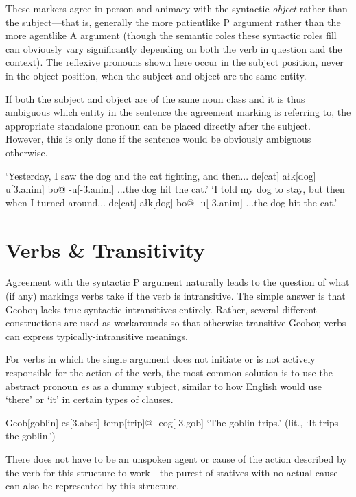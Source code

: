 \documentclass[a4paper,11pt,oneside,openany]{memoir}
\begin{document}
These markers agree in person and animacy with the syntactic \emph{object} rather than the subject---that is, generally the more patientlike P argument rather than the more agentlike A argument (though the semantic roles these syntactic roles fill can obviously vary significantly depending on both the verb in question and the context). The reflexive pronouns shown here occur in the subject position, never in the object position, when the subject and object are the same entity.

If both the subject and object are of the same noun class and it is thus ambiguous which entity in the sentence the agreement marking is referring to, the appropriate standalone pronoun can be placed directly after the subject. However, this is only done if the sentence would be obviously ambiguous otherwise.

\pex
\a
\begingl
\glpreamble
`Yesterday, I saw the dog and the cat fighting, and then...
\endpreamble
de{\vz}[cat]
a\l k[dog]
\vs u[\sc 3.anim]
bo\vl[strike]@
-\vs u[\sc -3.anim]
\glft ...the dog hit the cat.'
\endgl
\a 
\begingl
\glpreamble
`I told my dog to stay, but then when I turned around...
\endpreamble
de{\vz}[cat]
a\l k[dog]
bo\vl[strike]@
-\vs u[\sc -3.anim]
\glft ...the dog hit the cat.'
\endgl
\xe

\section{Verbs \& Transitivity}

Agreement with the syntactic P argument naturally leads to the question of what (if any) markings verbs take if the verb is intransitive. The simple answer is that Geoboŋ lacks true syntactic intransitives entirely. Rather, several different constructions are used as workarounds so that otherwise transitive Geoboŋ verbs can express typically-intransitive meanings.

For verbs in which the single argument does not initiate or is not actively responsible for the action of the verb, the most common solution is to use the abstract pronoun \textit{es} as a dummy subject, similar to how English would use `there' or `it' in certain types of clauses. 

\ex 
\begingl
Geob[goblin]
es[\sc 3.abst] 
\l emp[trip]@
-eog[\sc -3.gob]
\glft `The goblin trips.' (lit., `It trips the goblin.')
\endgl
\xe

There does not have to be an unspoken agent or cause of the action described by the verb for this structure to work---the purest of statives with no actual cause can also be represented by this structure.
\end{document}
